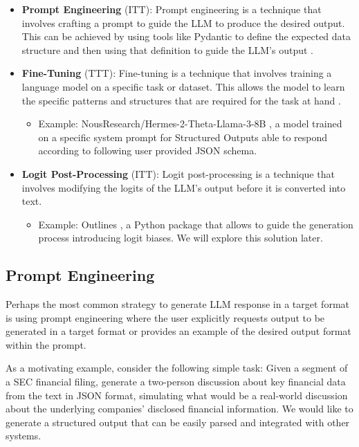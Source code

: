 \begin{itemize}
    \item \textbf{Prompt Engineering} (ITT): Prompt engineering is a technique that involves crafting a prompt to guide the LLM to produce the desired output. This can be achieved by using tools like Pydantic to define the expected data structure and then using that definition to guide the LLM's output .

    \item \textbf{Fine-Tuning} (TTT): Fine-tuning is a technique that involves training a language model on a specific task or dataset. This allows the model to learn the specific patterns and structures that are required for the task at hand .
    \begin{itemize}
        \item Example: NousResearch/Hermes-2-Theta-Llama-3-8B , a model trained on a specific system prompt for Structured Outputs able to respond according to following user provided JSON schema.
    \end{itemize}

    \item \textbf{Logit Post-Processing} (ITT): Logit post-processing is a technique that involves modifying the logits of the LLM's output before it is converted into text.
    \begin{itemize}
        \item Example: Outlines , a Python package that allows to guide the generation process introducing logit biases. We will explore this solution later.
    \end{itemize}
\end{itemize}

\subsection{Prompt Engineering}

Perhaps the most common strategy to generate LLM response in a target format is using prompt engineering where the user explicitly requests output to be generated in a target format or provides an example of the desired output format within the prompt.

As a motivating example, consider the following simple task: Given a segment of a SEC financial filing, generate a two-person discussion about key financial data from the text in JSON format, simulating what would be a real-world discussion about the underlying companies' disclosed financial information. We would like to generate a structured output that can be easily parsed and integrated with other systems.

